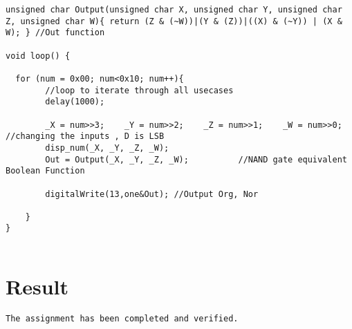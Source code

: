 \documentclass{article}
\begin{document}
\begin{verbatim}
unsigned char Output(unsigned char X, unsigned char Y, unsigned char Z, unsigned char W){ return (Z & (~W))|(Y & (Z))|((X) & (~Y)) | (X & W); } //Out function

void loop() {

  for (num = 0x00; num<0x10; num++){
        //loop to iterate through all usecases
        delay(1000);

        _X = num>>3;    _Y = num>>2;    _Z = num>>1;    _W = num>>0; //changing the inputs , D is LSB
        disp_num(_X, _Y, _Z, _W);
        Out = Output(_X, _Y, _Z, _W);          //NAND gate equivalent Boolean Function

        digitalWrite(13,one&Out); //Output Org, Nor

    }
}


\end{verbatim}

\section{Result}

\begin{verbatim}
The assignment has been completed and verified.
\end{verbatim}
\end{document}

